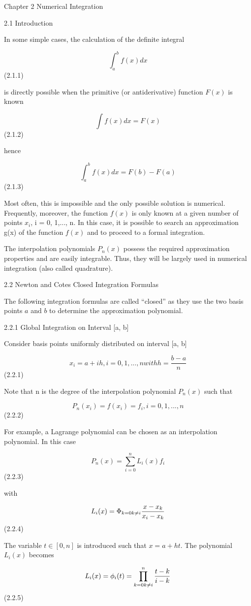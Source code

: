 \documentclass[letterpaper,12pt]{article}
\begin{document}
Chapter 2
Numerical Integration

2.1 Introduction

In some simple cases, the calculation of the definite integral

$$
\int^b_a f(x)dx
$$
 (2.1.1)

is directly possible when the primitive (or antiderivative) function $F(x)$ is known

$$
\int f(x)dx = F(x)
$$
 (2.1.2)

hence

$$
\int^b_a f(x)dx = F(b) - F(a) 
$$
(2.1.3)

Most often, this is impossible and the only possible solution is numerical. Frequently,
moreover, the function $f(x)$ is only known at a given number of points $x_i$, i =
0, 1,..., n. In this case, it is possible to search an approximation g(x) of the function
$f(x)$ and to proceed to a formal integration.

The interpolation polynomials $P_n(x)$ possess the required approximation properties
and are easily integrable. Thus, they will be largely used in numerical integration (also
called quadrature).

2.2 Newton and Cotes Closed Integration Formulas

The following integration formulas are called “closed” as they use the two basis points
$a$ and $b$ to determine the approximation polynomial.


2.2.1 Global Integration on Interval [a, b]

Consider basis points uniformly distributed on interval [a, b]

$$
x_i = a + ih, i = 0, 1,..., n with h = \frac{b - a}{n}
$$
(2.2.1)

Note that n is the degree of the interpolation polynomial $P_n(x)$ such that

$$
P_n(x_i) = f (x_i) = f_i , i = 0, 1,..., n
$$
 (2.2.2)

For example, a Lagrange polynomial can be chosen as an interpolation polynomial. In
this case

$$
P_n(x) = \sum^n_{i=0} L_i(x) f_i
$$
 (2.2.3)

with

$$
L_i(x) = \Phi_{k=0 \\ k \neq i} \frac{x-x_k}{x_i - x_k}
$$
(2.2.4)

The variable $t \in [0, n]$ is introduced such that $x = a + ht$. The polynomial $L_i(x)$
becomes

$$
L_i(x) = \phi_i(t) = \prod^n_{k=0 \\ k \neq i} \frac{t-k}{i-k}
$$
 (2.2.5)
\end{document}
